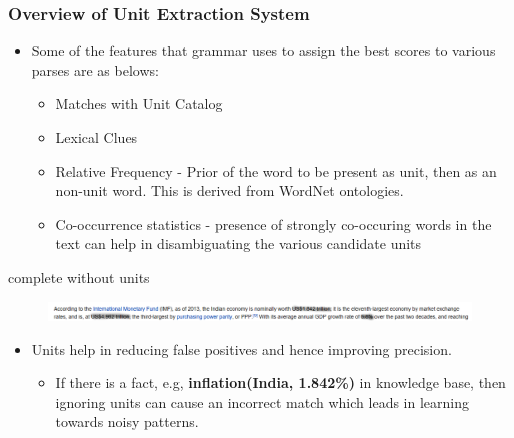 \documentclass{beamer}
\begin{document}
\begin{frame}
{\begin{frame}
 \frametitle{Overview of Unit Extraction System}
 \begin{itemize}
  \item Some of the features that grammar uses to assign the best scores to various
parses are as belows: \pause
    \begin{itemize}
        \item Matches with Unit Catalog \pause
	\item Lexical Clues \pause
	\item Relative Frequency - Prior of the word to be present as unit, then as an
	  non-unit word. This is derived from WordNet ontologies. \pause
	\item Co-occurrence statistics - presence of strongly co-occuring words in the
	  text can help in disambiguating the various candidate units 
    \end{itemize}
 \end{itemize}

 
 
\end{frame}

complete without units} 
    \begin{figure}
    \centering
    \includegraphics[width = 1.0\textwidth]{images/ex_6}
  \end{figure}
  
  \begin{itemize}
  \item Units help in reducing false positives and hence improving precision. \pause
  \begin{itemize}
      \item If there is a fact, e.g, \textbf{inflation(India, 1.842\%)} in knowledge base, then ignoring units can cause an incorrect match which leads in learning towards noisy patterns.
  \end{itemize}
  
 \end{itemize}

 
\end{frame}
\end{document}
